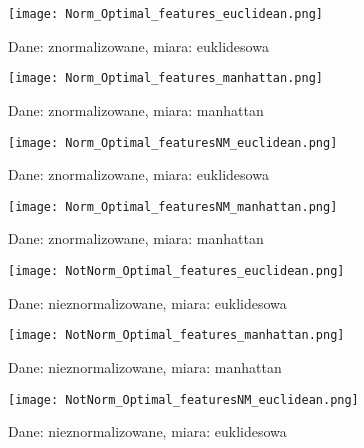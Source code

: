 	\begin{figure}[h!]
		\centering
		\texttt{[image: Norm\_Optimal\_features\_euclidean.png]}
		\captionsetup{justification=centering}
		\caption{Dane: znormalizowane, miara: euklidesowa}
		\label{fig:6}
	\end{figure}
	
	\begin{figure}[h!]
		\centering
		\texttt{[image: Norm\_Optimal\_features\_manhattan.png]}
		\captionsetup{justification=centering}
		\caption{Dane: znormalizowane, miara: manhattan}
		\label{fig:7}
	\end{figure}
	
	\begin{figure}[h!]
		\centering
		\texttt{[image: Norm\_Optimal\_featuresNM\_euclidean.png]}
		\captionsetup{justification=centering}
		\caption{Dane: znormalizowane, miara: euklidesowa}
		\label{fig:8}
	\end{figure}
	
	\begin{figure}[h!]
		\centering
		\texttt{[image: Norm\_Optimal\_featuresNM\_manhattan.png]}
		\captionsetup{justification=centering}
		\caption{Dane: znormalizowane, miara: manhattan}
		\label{fig:9}
	\end{figure}
	
	\begin{figure}[h!]
		\centering
		\texttt{[image: NotNorm\_Optimal\_features\_euclidean.png]}
		\captionsetup{justification=centering}
		\caption{Dane: nieznormalizowane, miara: euklidesowa}
		\label{fig:10}
	\end{figure}
	
	\begin{figure}[h!]
		\centering
		\texttt{[image: NotNorm\_Optimal\_features\_manhattan.png]}
		\captionsetup{justification=centering}
		\caption{Dane: nieznormalizowane, miara: manhattan}
		\label{fig:11}
	\end{figure}
	
	\begin{figure}[h!]
		\centering
		\texttt{[image: NotNorm\_Optimal\_featuresNM\_euclidean.png]}
		\captionsetup{justification=centering}
		\caption{Dane: nieznormalizowane, miara: euklidesowa}
		\label{fig:12}
	\end{figure}
	
